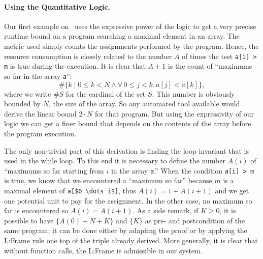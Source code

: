 \documentclass[nocopyrightspace,preprint]{sigplanconf}
\newcommand{\pref}[1]{\prettyref{#1}}
\begin{document}


\paragraph{Using the Quantitative Logic.}

Our first example on~\pref{fig:xmplmax} uses the expressive power of
the logic to get a very precise runtime bound on a program searching
a maximal element in an array.  The metric used simply counts the
assignments performed by the program.  Hence, the resource consumption
is closely related to the number $A$ of times the test \lstinline{a[i] > m}
is true during the execution.
%
It is clear that $A+1$ is the count of ``maximums so far in the
array \lstinline{a}'':
$$
  \# \{ k \mid 0 \le k < N \land \forall\, 0 \le j < k.\, a[j] < a[k] \},
$$
where we write $\# S$ for the cardinal of the set $S$.  This number is
obviously bounded by $N$, the size of the array.  So any automated tool
available would derive the linear bound $2 \cdot N$ for that program.
But using the expressivity of our logic we can get a finer bound
that depends on the contents of the array before the program execution.

The only non-trivial part of this derivation is finding the loop
invariant that is used in the while loop. To this end
it is necessary to define the number $A(i)$ of ``maximums so far
starting from $i$ in the array \lstinline{a}.''  When the condition
\lstinline{a[i] > m} is true, we know that we encountered a ``maximum
so far'' because $m$ is a maximal element of \lstinline{a[$0 \dots i$]},
thus $A(i) = 1 + A(i+1)$ and we get one potential unit to pay for the
assignment.  In the other case, no maximum so far is encountered so
$A(i) = A(i+1)$.  As a side remark, if $K \ge 0$, it is possible to
have $\{ A(0) + N + K \}$ and $\{ K \}$ as pre- and postcondition
of the same program; it can be done either by adapting the proof or by
applying the {\sc L:Frame} rule one top of the triple already derived.
More generally, it is clear that without function calls, the {\sc L:Frame}
is admissible in our system.
\end{document}
